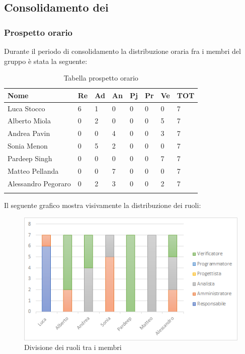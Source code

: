 \subsection{Consolidamento dei }
\subsubsection{Prospetto orario}
Durante il periodo di consolidamento la distribuzione oraria fra i membri del gruppo è stata la seguente:
\begin{center}
	\renewcommand{\arraystretch}{1.5}
	\begin{longtable}[H]{ p{3.5cm}  p{1.2cm} p{1.2cm}  p{1.2cm} p{1.2cm}  p{1.2cm} p{1.2cm}  p{1.4cm}  }
		\rowcolor{tableHeadYellow}
		\textbf{Nome}   & \textbf{Re} & \textbf{Ad} & \textbf{An} & \textbf{Pj} & \textbf{Pr} & \textbf{Ve} & \textbf{TOT} \\ 
		\endhead
		Luca Stocco       & 6   & 1     & 0   & 0   & 0   & 0  &    7 \\  
		Alberto Miola     & 0   & 2     & 0   & 0   & 0   & 5  &    7 \\  
		Andrea Pavin      & 0   & 0     & 4   & 0   & 0   & 3  &    7 \\  
		Sonia Menon       & 0   & 5     & 2   & 0   & 0   & 0  &    7 \\  
		Pardeep Singh     & 0   & 0     & 0   & 0   & 0   & 7  &    7 \\  
		Matteo Pellanda   & 0   & 0     & 7   & 0   & 0   & 0  &    7 \\
		Alessandro Pegoraro & 0 & 2 	& 3   &	0	& 0	  & 2 	& 7 \\ 
		\rowcolor{white}
		\caption{Tabella prospetto orario}
	\end{longtable}
\end{center}
Il seguente grafico mostra visivamente la distribuzione dei ruoli:
\begin{figure}[H]
	\centering
	\includegraphics[width=15cm,keepaspectratio]{../includes/pics/grafici/grafico3.png}
	\caption{\label{fig:mission}Divisione dei ruoli tra i membri}
\end{figure}
\clearpage
